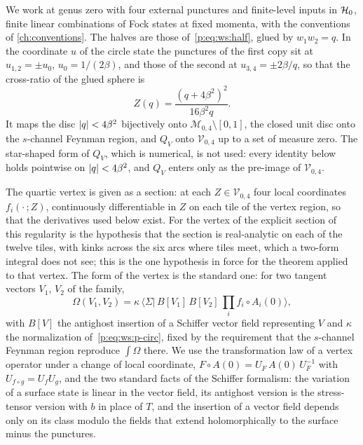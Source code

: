 We work at genus zero with four external punctures and finite-level inputs in $\mathcal{H}_0$, finite linear combinations of Fock states at fixed momenta, with the conventions of \cref{ch:conventions}.
The halves are those of~\eqref{p:eq:ws:half}, glued by $w_1 w_2 = q$.
In the coordinate $u$ of the circle state the punctures of the first copy sit at $u_{1,2} = \pm u_0$, $u_0 = 1 / (2 \beta)$, and those of the second at $u_{3,4} = \pm 2 \beta / q$, so that the cross-ratio of the glued sphere is
\begin{equation}
  \label{eq:wscircle:Zq}
  Z(q)
    = \frac{(q + 4 \beta^2)^2}{16 \beta^2 q}.
\end{equation}
It maps the disc ${|q|} < 4 \beta^2$ bijectively onto $\mathcal M_{0,4} \setminus [0, 1]$, the closed unit disc onto the $s$-channel Feynman region, and $Q_V$ onto $\mathcal V_{0,4}$ up to a set of measure zero.
The star-shaped form of $Q_V$, which is numerical, is not used: every identity below holds pointwise on ${|q|} < 4 \beta^2$, and $Q_V$ enters only as the pre-image of $\mathcal V_{0,4}$.

The quartic vertex is given as a section: at each $Z \in \mathcal V_{0,4}$ four local coordinates $f_i(\cdot \,; Z)$, continuously differentiable in $Z$ on each tile of the vertex region, so that the derivatives used below exist.
For the vertex of the explicit section of~\cite{Erbin:2026:SL2CVerticesClosed} this regularity is the hypothesis that the section is real-analytic on each of the twelve tiles, with kinks across the six arcs where tiles meet, which a two-form integral does not see; this is the one hypothesis in force for the theorem applied to that vertex.
The form of the vertex is the standard one: for two tangent vectors $V_1$, $V_2$ of the family,
\begin{equation}
  \label{eq:wscircle:Omega}
  \Omega(V_1, V_2)
    = \kappa \, \big\langle \Sigma \big| \, B[V_1] \, B[V_2] \, \prod_i f_i \circ A_i(0) \big\rangle,
\end{equation}
with $B[V]$ the antighost insertion of a Schiffer vector field representing $V$ and $\kappa$ the normalization of~\eqref{p:eq:ws:p-circ}, fixed by the requirement that the $s$-channel Feynman region reproduce $\int \Omega$ there.
We use the transformation law of a vertex operator under a change of local coordinate, $F \circ A(0) = U_F \, A(0) \, U_F^{-1}$ with $U_{f \circ g} = U_f U_g$, and the two standard facts of the Schiffer formalism: the variation of a surface state is linear in the vector field, its antighost version is the stress-tensor version with $b$ in place of $T$, and the insertion of a vector field depends only on its class modulo the fields that extend holomorphically to the surface minus the punctures.

